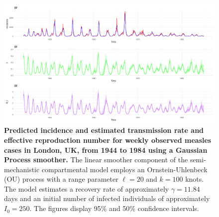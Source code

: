 \documentclass[
11pt, %
oneside, %
english, %
singlespacing, %
]{macthesis} %
\begin{document}
\begin{figure}
\centering
\includegraphics[width=\textwidth, height = \textwidth]{figure/Measles_combined_plot.png}
\caption[Predicted Measles Incidence and Estimated Transmission Rate and Effective Reproduction Number (1944-1984)]{\textbf{Predicted incidence and estimated transmission rate and effective reproduction number for weekly observed measles cases in London, UK, from 1944 to 1984 using a Gaussian Process smoother.} The linear smoother component of the semi-mechanistic compartmental model employs an Ornstein-Uhlenbeck (OU) process with a range parameter \(\ell = 20\) and \(k = 100\) knots. The model estimates a recovery rate of approximately \(\gamma = 11.84\) days and an initial number of infected individuals of approximately \(I_0 = 250\). The figures display 95\% and 50\% confidence intervals.}
\label{fig:Measles_trans}
\end{figure}
\end{document}
